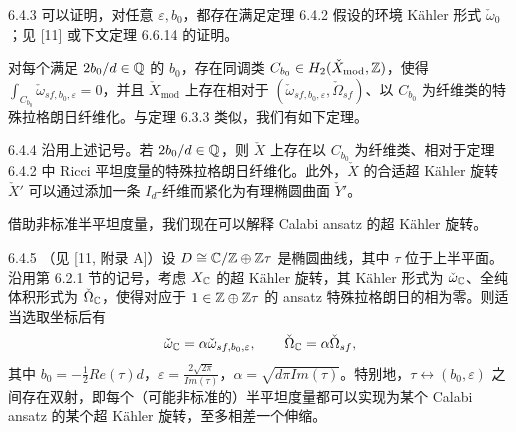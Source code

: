 \begin{remark}{6.4.3}
可以证明，对任意 $\varepsilon,b_0$，都存在满足定理 6.4.2 假设的环境 Kähler 形式 $\check\omega_0$；见 [11] 或下文定理 6.6.14 的证明。
\end{remark}

对每个满足 $2b_0/d\in\mathbb{Q}$ 的 $b_0$，存在同调类 $C_{b_0}\in H_2(\check X_{\mathrm{mod}},\mathbb{Z})$，使得 $\int_{C_{b_0}}\check\omega_{sf,b_0,\varepsilon}=0$，并且 $\check X_{\mathrm{mod}}$ 上存在相对于 $(\check\omega_{sf,b_0,\varepsilon},\check\Omega_{sf})$、以 $C_{b_0}$ 为纤维类的特殊拉格朗日纤维化。与定理 6.3.3 类似，我们有如下定理。

\begin{theorem}{6.4.4}
沿用上述记号。若 $2b_0/d\in\mathbb{Q}$，则 $\check X$ 上存在以 $C_{b_0}$ 为纤维类、相对于定理 6.4.2 中 Ricci 平坦度量的特殊拉格朗日纤维化。此外，$\check X$ 的合适超 Kähler 旋转 $\check X'$ 可以通过添加一条 $I_d$-纤维而紧化为有理椭圆曲面 $\check Y'$。
\end{theorem}

借助非标准半平坦度量，我们现在可以解释 Calabi ansatz 的超 Kähler 旋转。

\begin{theorem}{6.4.5}
（见 [11, 附录 A]）设 $D\cong\mathbb{C}/\mathbb{Z}\oplus\mathbb{Z}\tau$ 是椭圆曲线，其中 $\tau$ 位于上半平面。沿用第 6.2.1 节的记号，考虑 $X_{\mathbb{C}}$ 的超 Kähler 旋转，其 Kähler 形式为 $\check\omega_{\mathbb{C}}$、全纯体积形式为 $\check\Omega_{\mathbb{C}}$，使得对应于 $1\in\mathbb{Z}\oplus\mathbb{Z}\tau$ 的 ansatz 特殊拉格朗日的相为零。则适当选取坐标后有
\[
\check\omega_{\mathbb{C}}=\alpha\check\omega_{sf,b_0,\varepsilon},\qquad \check\Omega_{\mathbb{C}}=\alpha\check\Omega_{sf},
\]
其中 $b_0=-\frac{1}{2}Re(\tau)d$，$\varepsilon=\frac{2\sqrt{2\pi}}{Im(\tau)}$，$\alpha=\sqrt{d\pi Im(\tau)}$。特别地，$\tau\leftrightarrow(b_0,\varepsilon)$ 之间存在双射，即每个（可能非标准的）半平坦度量都可以实现为某个 Calabi ansatz 的某个超 Kähler 旋转，至多相差一个伸缩。
\end{theorem}
